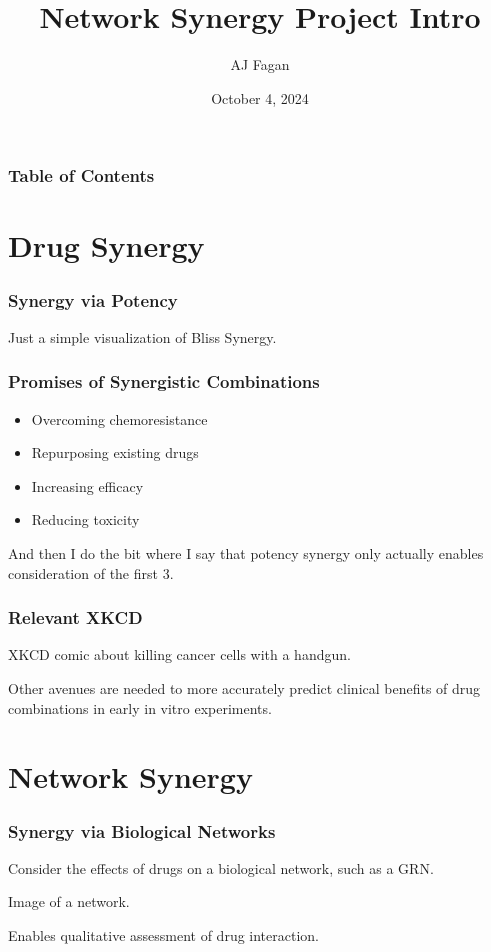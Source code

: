 \documentclass{beamer}
\author{AJ Fagan}
\title{Network Synergy Project Intro}
\date{October 4, 2024}
\begin{document}
\frame{\titlepage}


\begin{frame}
  \frametitle{Table of Contents}
  \tableofcontents
\end{frame}

\section{Drug Synergy}

\begin{frame}
  \frametitle{Synergy via Potency}
  Just a simple visualization of Bliss Synergy.
\end{frame}

\begin{frame}
  \frametitle{Promises of Synergistic Combinations}
  \begin{itemize}
    \item Overcoming chemoresistance 
    \item Repurposing existing drugs
    \item Increasing efficacy
    \item Reducing toxicity
  \end{itemize}

  And then I do the bit where I say that potency synergy only actually enables consideration of the first 3.    
\end{frame}

\begin{frame}
  \frametitle{Relevant XKCD}
  XKCD comic about killing cancer cells with a handgun.

  Other avenues are needed to more accurately predict clinical benefits of drug combinations in early in vitro experiments.
\end{frame}


\section{Network Synergy}

\begin{frame}
  \frametitle{Synergy via Biological Networks}
  Consider the effects of drugs on a biological network, such as a GRN.

  Image of a network.

  Enables qualitative assessment of drug interaction.
\end{frame}
\end{document}
